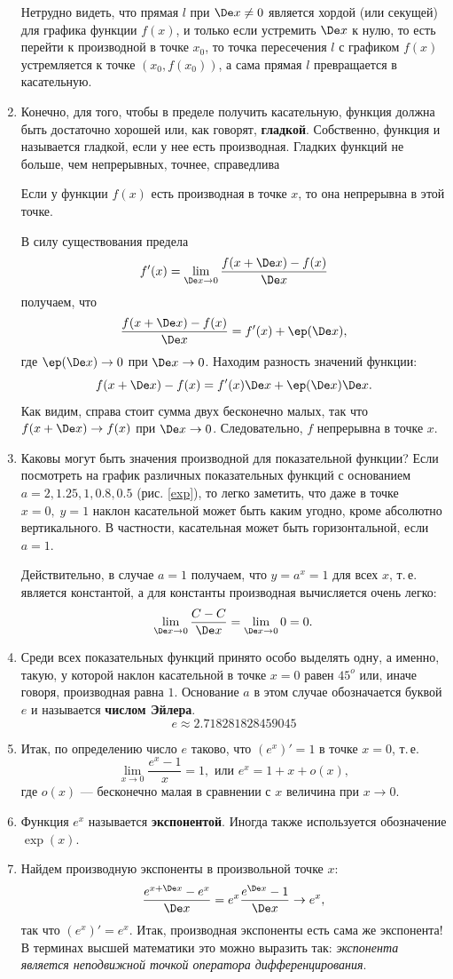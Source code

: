 \begin{enumerate}
Нетрудно видеть, что прямая $l$ при $\De x\ne 0$ является хордой (или секущей) для графика функции $f(x)$, и только если устремить $\De x$ к нулю, то есть перейти к производной в точке $x_0$, то точка пересечения $l$ с графиком $f(x)$ устремляется к точке $(x_0,f(x_0))$, а сама прямая $l$ превращается в касательную.

\item Конечно, для того, чтобы в пределе получить касательную, функция должна быть достаточно хорошей или, как говорят, \textbf{гладкой}. Собственно, функция и называется гладкой, если у нее есть производная. Гладких функций не больше, чем непрерывных, точнее, справедлива
\begin{thrm} Если у функции $f(x)$ есть производная в точке $x$, то она непрерывна в этой точке.
\end{thrm}
\pf
В силу существования предела
$$
f'(x)=\lim_{\De x\to 0}\frac{f(x+\De x)-f(x)}{\De x}
$$
получаем, что
$$
\frac{f(x+\De x)-f(x)}{\De x}=f'(x)+\ep(\De x),
$$
где $\ep(\De x)\to 0$ при $\De x\to 0$. Находим разность значений функции:
$$
f(x+\De x)-f(x) = f'(x)\De x+\ep(\De x)\De x.
$$
Как видим, справа стоит сумма двух бесконечно малых, так что $f(x+\De x)\to f(x)$ при $\De x\to 0$. Следовательно, $f$ непрерывна в точке $x$.
\epf

\item Каковы могут быть значения производной для показательной функции? Если посмотреть на график различных показательных функций с основанием $a=2,1.25,1,0.8,0.5$ (рис. \ref{exp}), то легко заметить, что даже в точке $x=0,\; y=1$ наклон касательной может быть каким угодно, кроме абсолютно вертикального. В частности, касательная может быть горизонтальной, если $a=1$.

Действительно, в случае $a=1$ получаем, что $y=a^x=1$ для всех $x$, т.\,е. является константой, а для константы производная вычисляется очень легко:
$$
\lim_{\De x\to 0}\frac{C-C}{\De x}=\lim_{\De x\to 0}0=0.
$$
\item Среди всех показательных функций принято особо выделять одну, а именно, такую, у которой наклон касательной в точке $x=0$ равен $45^o$ или, иначе говоря, производная равна $1$. Основание $a$ в этом случае обозначается буквой $e$ и называется \textbf{числом Эйлера}.
$$
e\approx 2.718281828459045
$$
\item Итак, по определению число $e$ таково, что $(e^x)'=1$ в точке $x=0$, т.\,е.
$$
\lim_{x\to 0}\frac{e^x-1}{x}=1,\mbox{ или }e^x=1+x+o(x),
$$
где $o(x)$ --- бесконечно малая в сравнении с $x$ величина при $x\to 0$.
\item Функция $e^x$ называется \textbf{экспонентой}. Иногда также используется обозначение $\exp(x)$.
\item Найдем производную экспоненты в произвольной точке $x$:
$$
\frac{e^{x+\De x}-e^x}{\De x}=e^x\frac{e^{\De x}-1}{\De x}\to e^x,
$$
так что $(e^x)'=e^x$. Итак, производная экспоненты есть сама же экспонента! В терминах высшей математики это можно выразить так: \textit{экспонента является неподвижной точкой оператора дифференцирования}.



\end{enumerate}
